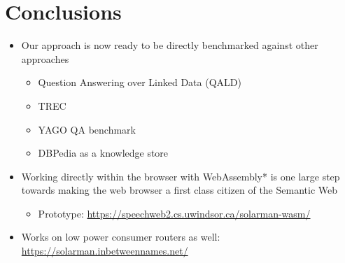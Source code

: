 \documentclass[logoontitle,tabu,supertabular,aspectratio=43]{preney-uwindsor-beamer}
\begin{document}
    \section{Conclusions}
    \begin{frame}{\insertsection}
        \begin{itemize}
            \item Our approach is now ready to be directly benchmarked against other approaches
            \begin{itemize}
                \item Question Answering over Linked Data (QALD)
                \item TREC %
                \item YAGO QA benchmark
                \item DBPedia as a knowledge store
            \end{itemize}
            \item Working directly within the browser with WebAssembly* is one large step towards making the web browser a first class citizen of the Semantic Web
            \begin{itemize}
                \item Prototype: \url{https://speechweb2.cs.uwindsor.ca/solarman-wasm/}
            \end{itemize}
            \item Works on low power consumer routers as well: \url{https://solarman.inbetweennames.net/}
        \end{itemize}
    \end{frame}
\end{document}
